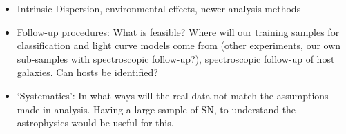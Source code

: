\begin{itemize}
\item Intrinsic Dispersion, environmental effects, newer analysis methods 
\item Follow-up
procedures: What is feasible? Where will our training samples for classification and light
curve models come from (other experiments, our own sub-samples with spectroscopic
follow-up?), spectroscopic follow-up of host galaxies. Can hosts be identified? 
\item `Systematics': In what ways will the real data not match the assumptions made in analysis.
Having a large sample of SN, to understand the astrophysics would be useful for this. 
\end{itemize}



\navigationbar

%
